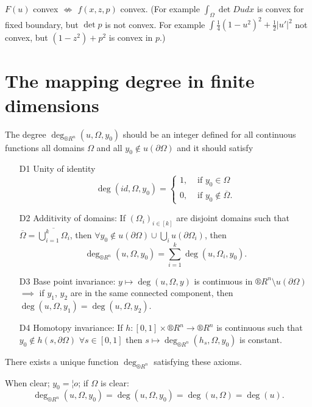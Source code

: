 \documentclass[12pt]{article}					%
\begin{document}
\begin{poznamka}
	$F(u)$ convex $\not\Leftrightarrow$ $f(x, z, p)$  convex. (For example $\int_Ω \det Du dx$ is convex for fixed boundary, but $\det p$ is not convex. For example $\int \frac{1}{4} (1 - u^2)^2 + \frac{1}{2} |u'|^2$ not convex, but $(1 - z^2) + p^2$ is convex in $p$.)
\end{poznamka}

\section{The mapping degree in finite dimensions}
\begin{definice}
	The degree $\deg_{®R^n}(u, Ω, y_0)$ should be an integer defined for all continuous functions all domains $Ω$ and all $y_0 \notin u(\partial Ω)$ and it should satisfy
	\begin{itemize}
		\item[D1] Unity of identity
			$$ \deg(id, Ω, y_0) = \begin{cases}1, & \text{ if } y_0 \in Ω\\0, & \text{ if } y_0 \notin \overline{Ω}.\end{cases} $$
		\item[D2] Additivity of domains: If $(Ω_i)_{i \in [k]}$ are disjoint domains such that $\overline{Ω} = \overline{\bigcup_{i=1}^k Ω_i}$, then $\forall y_0 \notin u(\partial Ω) \cup \bigcup_i u(\partial Ω_i)$, then
			$$ \deg_{®R^n}(u, Ω, y_0) = \sum_{i=1}^k \deg(u, Ω_i, y_0). $$
		\item[D3] Base point invariance: $y \mapsto \deg(u, Ω, y)$ is continuous in $®R^n \setminus u(\partial Ω)$ $\implies$ if $y_1$, $y_2$ are in the same connected component, then $\deg(u, Ω, y_1) = \deg(u, Ω, y_2)$.
		\item[D4] Homotopy invariance: If $h: [0, 1] \times ®R^n \rightarrow ®R^n$ is continuous such that $y_0 \notin h(s, \partial Ω)$ $\forall s \in [0, 1]$ then $s \mapsto \deg_{®R^n}(h_s, Ω, y_0)$ is constant.
	\end{itemize}
\end{definice}

\begin{veta}
	There exists a unique function $\deg_{®R^n}$ satisfying these axioms.

	\begin{poznamkain}[Notation]
		When clear; $y_0 = ¦o$; if $Ω$ is clear:
		$$ \deg_{®R^n}(u, Ω, y_0) = \deg(u, Ω, y_0) = \deg(u, Ω) = \deg(u). $$
	\end{poznamkain}
\end{veta}
\end{document}
